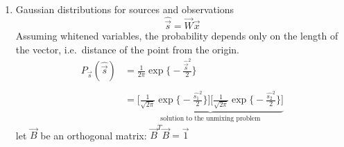 \begin{enumerate}[(1)]
\begin{equation*}
\begin{array}{ccc}
\begin{array}{ll}
		\mathrm{w}_{21} & \mathrm{w}_{22} 
	\end{array} \right)
	\left( \begin{array}{ll}
		\mathrm{x}_1 \\ \mathrm{x}_2
	\end{array} \right)
	& \corresponds &
	\left( \begin{array}{ll}
		a\widehat{s}_1 \\ b\widehat{s}_2
	\end{array} \right)
	=
	\left( \begin{array}{ll}
		a\mathrm{w}_{11} & a\mathrm{w}_{12} \\
		b\mathrm{w}_{21} & b\mathrm{w}_{22} 
	\end{array} \right)
	\left( \begin{array}{ll}
		\mathrm{x}_1 \\ \mathrm{x}_2
	\end{array} \right)
	\\\\
	P_{s_1} (\widehat{s}_1) \cdot P_{s_2} (\widehat{s}_2)
	&& 
	P_{s_1} (a\widehat{s}_1) \cdot P_{s_2} (b\widehat{s}_2)
	\end{array}
\end{equation*}
\indent both alternatives are solutions to the unmixing problem
\\\\
\item Gaussian distributions for sources and observations
\begin{equation*}
	\widehat{\vec{s}} = \vec{W} \vec{x} 
\end{equation*}
Assuming whitened variables, the probability depends only on the length of the vector, i.e.\ distance of the point from the origin. 
\begin{equation}
	\begin{array}{ll}
	P_{\vec{s}}(\widehat{\vec{s}}) 
	& = \frac{1}{2\pi} \exp \bigg\{ -\frac{\widehat{\vec{s}}^2}{2} \bigg\}
	\\\\
	& = \underbrace{ \Bigg[ \frac{1}{\sqrt{2\pi}} \exp \bigg\{ -
		\frac{\widehat{s_1}^2}{2} \bigg\} \Bigg] \Bigg[
			\frac{1}{\sqrt{2\pi}} \exp \bigg\{ -
			\frac{\widehat{s_2}^2}{2} \bigg\}
		\Bigg] }_{\text{solution to the unmixing problem} }
	\end{array}
\end{equation}
\indent let $\vec{B}$ be an orthogonal matrix: $\vec{B}^T \vec{B} = \vec{1}$
\begin{equation}

\end{equation}
\end{enumerate}
